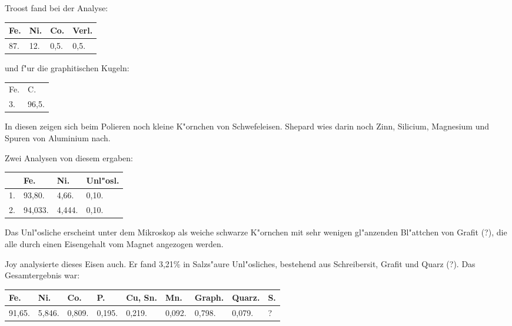 \documentclass[a4paper, 11pt, oneside]{article}
\begin{document}
Troost fand bei der Analyse:
\begin{table}[H]
    \centering
    \begin{tabular}{l l l l}
        Fe. & Ni. & Co. & Verl. \\ \hline
        87. & 12. & 0,5. & 0,5. \\
    \end{tabular}
\end{table}

und f"ur die graphitischen Kugeln:
\begin{table}[H]
    \centering
    \begin{tabular}{l l}
        Fe. & C. \\
        3. & 96,5. \\
    \end{tabular}
\end{table}

In diesen zeigen sich beim Polieren noch kleine K"ornchen von Schwefeleisen. Shepard wies darin noch Zinn, Silicium, Magnesium und Spuren von Aluminium nach.

Zwei Analysen von diesem ergaben:
\begin{table}[H]
    \centering
    \begin{tabular}{l l l l}
         & Fe. & Ni. & Unl"osl. \\ \hline
        1. & 93,80. & 4,66. & 0,10. \\
        2. & 94,033. & 4,444. & 0,10. \\
    \end{tabular}
\end{table}

Das Unl"osliche erscheint unter dem Mikroskop als weiche schwarze K"ornchen mit sehr wenigen gl"anzenden Bl"attchen von Grafit (?), die alle durch einen Eisengehalt vom Magnet angezogen werden.

Joy analysierte dieses Eisen auch. Er fand 3,21\% in Salzs"aure Unl"osliches, bestehend aus Schreibersit, Grafit und Quarz (?). Das Gesamtergebnis war:
\begin{table}[H]
    \centering
    \begin{tabular}{l l l l l l l l l}
        Fe. & Ni. & Co. & P. & Cu, Sn. & Mn. & Graph. & Quarz. & S. \\ \hline
        91,65. & 5,846. & 0,809. & 0,195. & 0,219. & 0,092. & 0,798. & 0,079. & ? \\
    \end{tabular}
\end{table}
\end{document}
